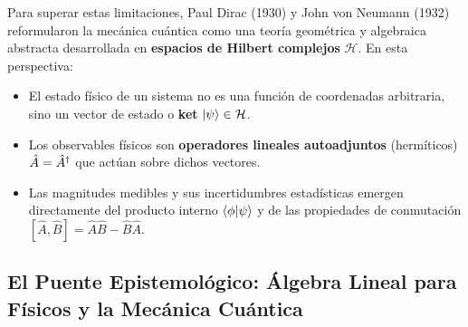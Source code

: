 Para superar estas limitaciones, Paul Dirac (1930) \cite{dirac} y John von Neumann (1932) reformularon la mecánica cuántica como una teoría geométrica y algebraica abstracta desarrollada en \textbf{espacios de Hilbert complejos} $\mathcal{H}$. En esta perspectiva:
\begin{itemize}
    \item El estado físico de un sistema no es una función de coordenadas arbitraria, sino un vector de estado o \textbf{ket} $\left| \psi \right\rangle \in \mathcal{H}$.
    \item Los observables físicos son \textbf{operadores lineales autoadjuntos} (hermíticos) $\hat{A} = \hat{A}^\dagger$ que actúan sobre dichos vectores.
    \item Las magnitudes medibles y sus incertidumbres estadísticas emergen directamente del producto interno $\left\langle \phi \middle| \psi \right\rangle$ y de las propiedades de conmutación $[\hat{A}, \hat{B}] = \hat{A}\hat{B} - \hat{B}\hat{A}$.
\end{itemize}

\subsection{El Puente Epistemológico: Álgebra Lineal para Físicos y la Mecánica Cuántica}

